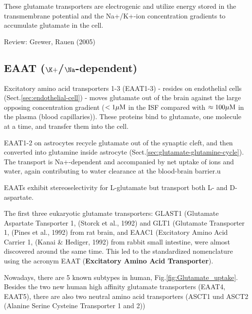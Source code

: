 These glutamate transporters are electrogenic and utilize energy stored in the
transmembrane potential and the Na+/K+-ion concentration gradients to accumulate
glutamate in the cell.

Review: Grewer, Rauen (2005)


\subsection{EAAT ($\K+$/$\Na$-dependent)}
\label{sec:EAAT}
\label{sec:GLT1}
\label{sec:EAAC1}
\label{sec:GLAST1}

Excitatory amino acid transporters 1-3 (EAAT1-3) - resides on endothelial cells
(Sect.\ref{sec:endothelial-cell}) - moves glutamate out of the brain against the
large opposing concentration gradient ($< 1 {\mu\text{M}}$ in the ISF compared with
$\approx 100 {\mu\text{M}}$ in the plasma (blood capillaries)).
These proteins bind to glutamate, one molecule at a time, and transfer them into
the cell.  

EAAT1-2 on astrocytes recycle glutamate out of the synaptic cleft, and then
converted into glutamine inside astrocyte
(Sect.\ref{sec:glutamate-glutamine-cycle}). The transport is Na+-dependent and
accompanied by net uptake of ions and water, again contributing to water
clearance at the blood-brain barrier.u

\begin{mdframed}
EAATs exhibit stereoselectivity for L-glutamate but transport both L- and
D-aspartate.

The first three eukaryotic glutamate transporters: GLAST1 (Glutamate Aspartate
Tansporter 1, (Storck et al., 1992) and GLT1 (Glutamate Transporter 1, (Pines et
al., 1992) from rat brain, and EAAC1 (Excitatory Amino Acid Carrier 1, (Kanai \&
Hediger, 1992) from rabbit small intestine, were almost discovered around the
same time. This led to the standardized nomenclature using the acronym EAAT
({\bf Excitatory Amino Acid Transporter}).
\end{mdframed}


Nowadays, there are 5 known subtypes in human, Fig.\ref{fig:Glutamate_uptake}.
Besides the two new human high affinity glutamate transporters (EAAT4, EAAT5),
there are also two neutral amino acid transporters (ASCT1 und ASCT2 (Alanine
Serine Cysteine Transporter 1 and 2))

